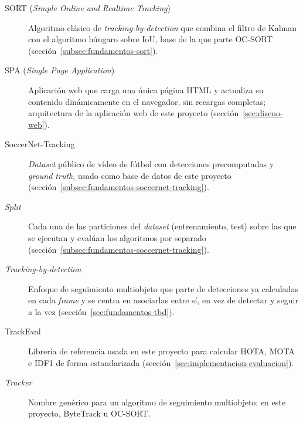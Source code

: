 \begin{description}
\item[SORT (\emph{Simple Online and Realtime Tracking})] Algoritmo
  clásico de \emph{tracking-by-detection} que combina el filtro de Kalman
  con el algoritmo húngaro sobre IoU, base de la que parte OC-SORT
  (sección~\ref{subsec:fundamentos-sort}).

\item[SPA (\emph{Single Page Application})] Aplicación web que carga una
  única página HTML y actualiza su contenido dinámicamente en el
  navegador, sin recargas completas; arquitectura de la aplicación web de
  este proyecto (sección~\ref{sec:diseno-web}).

\item[SoccerNet-Tracking] \emph{Dataset} público de vídeo de fútbol con
  detecciones precomputadas y \emph{ground truth}, usado como base de
  datos de este proyecto
  (sección~\ref{subsec:fundamentos-soccernet-tracking}).

\item[\emph{Split}] Cada una de las particiones del \emph{dataset}
  (entrenamiento, test) sobre las que se ejecutan y evalúan los
  algoritmos por separado (sección~\ref{subsec:fundamentos-soccernet-tracking}).

\item[\emph{Tracking-by-detection}] Enfoque de seguimiento multiobjeto
  que parte de detecciones ya calculadas en cada \emph{frame} y se centra
  en asociarlas entre sí, en vez de detectar y seguir a la vez
  (sección~\ref{sec:fundamentos-tbd}).

\item[TrackEval] Librería de referencia usada en este proyecto para
  calcular HOTA, MOTA e IDF1 de forma estandarizada
  (sección~\ref{sec:implementacion-evaluacion}).

\item[\emph{Tracker}] Nombre genérico para un algoritmo de seguimiento
  multiobjeto; en este proyecto, ByteTrack u OC-SORT.
\end{description}
